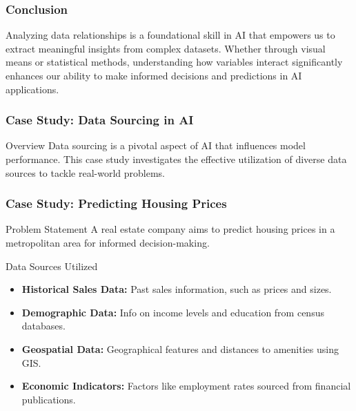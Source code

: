 \documentclass[aspectratio=169]{beamer}
\begin{document}
\begin{frame}[fragile]
    \frametitle{Conclusion}
    Analyzing data relationships is a foundational skill in AI that empowers us to extract meaningful insights from complex datasets. Whether through visual means or statistical methods, understanding how variables interact significantly enhances our ability to make informed decisions and predictions in AI applications.
\end{frame}

\begin{frame}
    \frametitle{Case Study: Data Sourcing in AI}
    \begin{block}{Overview}
        Data sourcing is a pivotal aspect of AI that influences model performance. This case study investigates the effective utilization of diverse data sources to tackle real-world problems.
    \end{block}
\end{frame}

\begin{frame}
    \frametitle{Case Study: Predicting Housing Prices}
    \begin{block}{Problem Statement}
        A real estate company aims to predict housing prices in a metropolitan area for informed decision-making.
    \end{block}
    
    \begin{block}{Data Sources Utilized}
        \begin{itemize}
            \item \textbf{Historical Sales Data:} Past sales information, such as prices and sizes.
            \item \textbf{Demographic Data:} Info on income levels and education from census databases.
            \item \textbf{Geospatial Data:} Geographical features and distances to amenities using GIS.
            \item \textbf{Economic Indicators:} Factors like employment rates sourced from financial publications.
        \end{itemize}
    \end{block}
\end{frame}
\end{document}
